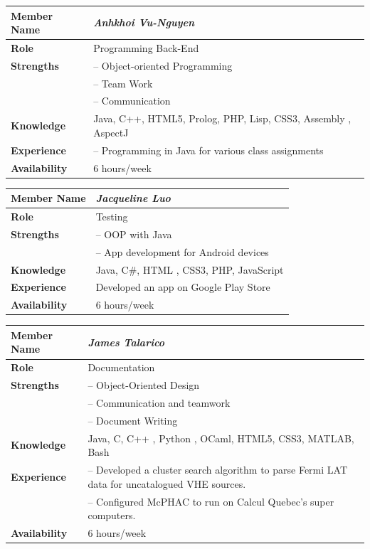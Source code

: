 \documentclass[12pt]{article}
\begin{document}
%
\vspace{3mm}
%
\begin{center}
\begin{tabular}{ p{2.7cm} | p{9cm} }
\hline
\textbf{Member Name}	&	\textit{\textbf{Anhkhoi Vu-Nguyen}}	\\ \hline \hline
\textbf{Role}		&	Programming Back-End	\\ \hline
\textbf{Strengths}	&	-- Object-oriented Programming	\\
					&	-- Team Work	\\
					&	-- Communication	\\ \hline
\textbf{Knowledge}	&	Java, C++, HTML5, Prolog, PHP, Lisp, CSS3, Assembly , AspectJ	\\ \hline
\textbf{Experience}	&	-- Programming in Java for various class assignments 	\\ \hline
\textbf{Availability}	&	6 hours/week	\\ \hline
\end{tabular}
\end{center}
%
\vspace{3mm}
%
\begin{center}
\begin{tabular}{ p{2.7cm} | p{9cm} }
\hline
\textbf{Member Name}	&	\textit{\textbf{Jacqueline Luo}}	\\ \hline \hline
\textbf{Role}		&	Testing	\\ \hline
\textbf{Strengths}	&	-- OOP with Java	\\
					&	-- App development for Android devices	\\ \hline
\textbf{Knowledge}	&	Java, C\#, HTML , CSS3, PHP, JavaScript	\\ \hline
\textbf{Experience}	&	Developed an app on Google Play Store	\\ \hline
\textbf{Availability}	&	6 hours/week	\\ \hline
\end{tabular}
\end{center}
%
\vspace{3mm}
%
\begin{center}
\begin{tabular}{ p{2.7cm} | p{9cm} }
\hline
\textbf{Member Name}	&	\textit{\textbf{James Talarico}}	\\ \hline \hline
\textbf{Role}		&	Documentation	\\ \hline
\textbf{Strengths}	&	-- Object-Oriented Design	\\
					&	-- Communication and teamwork	\\
					&	-- Document Writing	\\ \hline
\textbf{Knowledge}	&	Java, C, C++ , Python , OCaml, HTML5, CSS3, MATLAB, Bash	\\ \hline
\textbf{Experience}	&	-- Developed a cluster search algorithm to parse Fermi LAT data for uncatalogued VHE sources.	\\
					&	-- Configured McPHAC to run on Calcul Quebec's super computers.	\\ \hline
\textbf{Availability}	&	6 hours/week	\\ \hline
\end{tabular}
\end{center}
\end{document}
